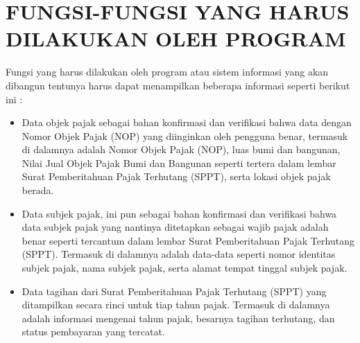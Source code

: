 \chapter{FUNGSI-FUNGSI YANG HARUS DILAKUKAN OLEH PROGRAM}

Fungsi yang harus dilakukan oleh program atau sistem informasi yang akan dibangun tentunya harus dapat menampilkan beberapa informasi seperti berikut ini :

\begin{itemize}
	\item Data objek pajak sebagai bahan konfirmasi dan verifikasi bahwa data dengan Nomor Objek Pajak (NOP) yang diinginkan oleh pengguna benar, termasuk di dalamnya adalah Nomor Objek Pajak (NOP), luas bumi dan bangunan, Nilai Jual Objek Pajak Bumi dan Bangunan seperti tertera dalam lembar Surat Pemberitahuan Pajak Terhutang (SPPT), serta lokasi objek pajak berada.
	\item Data subjek pajak, ini pun sebagai bahan konfirmasi dan verifikasi bahwa data subjek pajak yang nantinya ditetapkan sebagai wajib pajak adalah benar seperti tercantum dalam lembar Surat Pemberitahuan Pajak Terhutang (SPPT). Termasuk di dalamnya adalah data-data seperti nomor identitas subjek pajak, nama subjek pajak, serta alamat tempat tinggal subjek pajak.
	\item Data tagihan dari Surat Pemberitahuan Pajak Terhutang (SPPT) yang ditampilkan secara rinci untuk tiap tahun pajak. Termasuk di dalamnya adalah informasi mengenai tahun pajak, besarnya tagihan terhutang, dan status pembayaran yang tercatat.
\end{itemize}